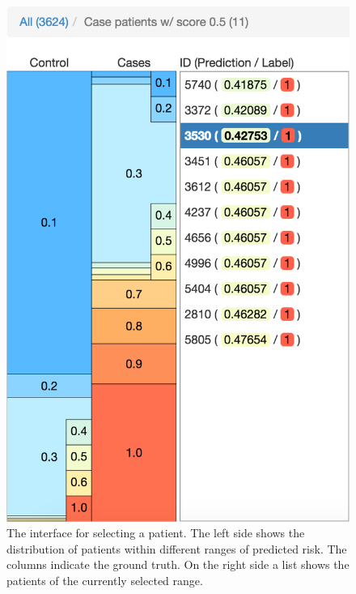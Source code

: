 \begin{figure}
\centering
\includegraphics[width=0.5\linewidth]{prospector/patient_select} %
\caption[The interface for selecting a patient.]{
The interface for selecting a patient.
The left side shows the distribution of patients within different ranges of predicted risk.
The columns indicate the ground truth.
On the right side a list shows the patients of the currently selected range.
}
\label{figs:select}
\end{figure}